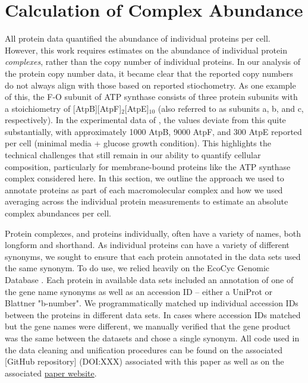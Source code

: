 \section{Calculation of Complex Abundance}

All protein data quantified the abundance of individual proteins per cell.
However, this work requires estimates on the abundance of individual protein
\textit{complexes}, rather than the copy number of individual proteins. In our
analysis of the protein copy number data, it became clear that the reported copy
numbers do not always align with those based on reported stiochometry. As one
example of this, the F-O subunit of ATP synthase consists of three protein
subunits with a stoichiometry of [AtpB][AtpF]$_2$[AtpE]$_{10}$ (also referred to
as subunits a, b, and c, respectively). In the experimental data of
\cite{schmidt2016}, the values deviate from this quite substantially, with
approximately 1000 AtpB, 9000 AtpF, and 300 AtpE reported per cell (minimal
media + glucose growth condition).  This highlights the technical challenges
that still remain in our ability to quantify cellular composition, particularly
for membrane-bound proteins like the ATP synthase complex considered here.  In
this section, we outline the approach we used to annotate proteins as part of
each macromolecular complex and how we used averaging across the individual
protein measurements to estimate an absolute complex abundances per cell.

Protein complexes, and proteins individually, often have a variety of names,
both longform and shorthand. As individual proteins can have a variety of
different synonyms, we sought to ensure that each protein annotated in the
data sets used the same synonym. To do use, we relied heavily on the EcoCyc
Genomic Database \citep{keseler2017}.  Each protein in available data sets
included an annotation of one of the gene name synonyms as well as an
accession ID -- either a UniProt or Blattner "b-number". We programmatically
matched up individual accession IDs between the proteins in different data sets.
In cases where accession IDs matched but the gene names were different, we
manually verified that the gene product was the same between the datasets and
chose a single synonym.  All code used  in the data cleaning and unification
procedures can be found on the associated
\href{https://github.com/rpgroup-pboc/growth_limits}[GitHub repository]
(DOI:XXX) associated with this paper as well as on the associated
\href{https://rpgroup.caltech.edu/growth_limits}{paper website}.

